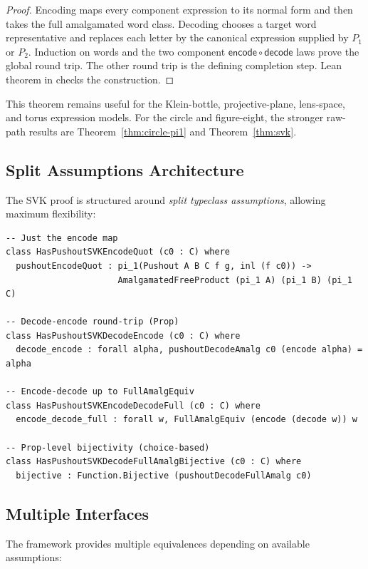 \documentclass{lmcs}
\theoremstyle{definition}
\theoremstyle{plain}
\theoremstyle{remark}
\begin{document}
\begin{proof}
Encoding maps every component expression to its normal form and then takes the
full amalgamated word class.  Decoding chooses a target word representative
and replaces each letter by the canonical expression supplied by \(P_1\) or
\(P_2\).  Induction on words and the two component
\(\mathsf{encode}\circ\mathsf{decode}\) laws prove the global round trip.  The
other round trip is the defining completion step.  Lean theorem
 in
 checks the construction.
\end{proof}

This theorem remains useful for the Klein-bottle, projective-plane, lens-space,
and torus expression models.  For the circle and figure-eight, the stronger
raw-path results are Theorem~\ref{thm:circle-pi1} and
Theorem~\ref{thm:svk}.

\subsection{Split Assumptions Architecture}

The SVK proof is structured around \emph{split typeclass assumptions}, allowing maximum flexibility:

\begin{lstlisting}
-- Just the encode map
class HasPushoutSVKEncodeQuot (c0 : C) where
  pushoutEncodeQuot : pi_1(Pushout A B C f g, inl (f c0)) ->
                      AmalgamatedFreeProduct (pi_1 A) (pi_1 B) (pi_1 C)

-- Decode-encode round-trip (Prop)
class HasPushoutSVKDecodeEncode (c0 : C) where
  decode_encode : forall alpha, pushoutDecodeAmalg c0 (encode alpha) = alpha

-- Encode-decode up to FullAmalgEquiv
class HasPushoutSVKEncodeDecodeFull (c0 : C) where
  encode_decode_full : forall w, FullAmalgEquiv (encode (decode w)) w

-- Prop-level bijectivity (choice-based)
class HasPushoutSVKDecodeFullAmalgBijective (c0 : C) where
  bijective : Function.Bijective (pushoutDecodeFullAmalg c0)
\end{lstlisting}

\subsection{Multiple Interfaces}

The framework provides multiple equivalences depending on available assumptions:
\end{document}
